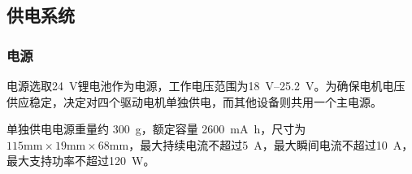\documentclass[10pt]{ctexart}
\begin{document}
\subsection{供电系统}
\subsubsection{电源}
电源选取\SI{24}{\volt}锂电池作为电源，工作电压范围为\SIrange{18}{25.2}{\volt}。为确保电机电压供应稳定，决定对四个驱动电机单独供电，而其他设备则共用一个主电源。

单独供电电源重量约 \SI{300}{\gram}，额定容量 \SI{2600}{\milli\ampere\hour}，尺寸为 $115\si{\milli\meter}\times 19\si{\milli\meter}\times 68\si{\milli\meter}$，最大持续电流不超过\SI{5}{\ampere}，最大瞬间电流不超过\SI{10}{\ampere}，最大支持功率不超过\SI{120}{\watt}。
\end{document}
